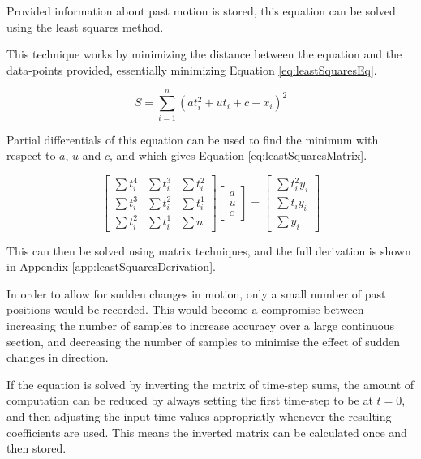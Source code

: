\documentclass[10pt]{article}
\begin{document}
Provided information about past motion is stored, this equation can be solved
using the least squares method.  

This technique works by minimizing the distance between the equation and the
data-points provided, essentially minimizing Equation \ref{eq:leastSquaresEq}.

\begin{equation}
  S = \sum_{i=1}^n (a t_i^2+ u t_i + c - x_i)^2 
  \label{eq:leastSquaresEq}
\end{equation}

Partial differentials of this equation can be used to find the minimum with
respect to $a$, $u$ and $c$, and which gives Equation
\ref{eq:leastSquaresMatrix}.

\begin{equation}
  \left[
   \begin{matrix}
    \sum t_i^4 & \sum t_i^3 & \sum t_i^2 \\
    \sum t_i^3 & \sum t_i^2 & \sum t_i^1 \\
    \sum t_i^2 & \sum t_i^1 & \sum n
   \end{matrix}
  \right]
  \left[
   \begin{matrix}
    a \\
    u \\
    c
   \end{matrix}
  \right]
  =
  \left[
   \begin{matrix}
    \sum t_i^2 y_i \\
    \sum t_i y_i \\
    \sum y_i
   \end{matrix}
  \right]
  \label{eq:leastSquaresMatrix}
\end{equation}

This can then be solved using matrix techniques, and the full derivation is
shown in Appendix \ref{app:leastSquaresDerivation}.

In order to allow for sudden changes in motion, only a small number of past
positions would be recorded.  This would become a compromise between increasing
the number of samples to increase accuracy over a large continuous section, and
decreasing the number of samples to minimise the effect of sudden changes in
direction.

If the equation is solved by inverting the matrix of time-step sums, the amount
of computation can be reduced by always setting the first time-step to be at
$t=0$, and then adjusting the input time values appropriatly whenever the
resulting coefficients are used.  This means the inverted matrix can be
calculated once and then stored.
\end{document}
